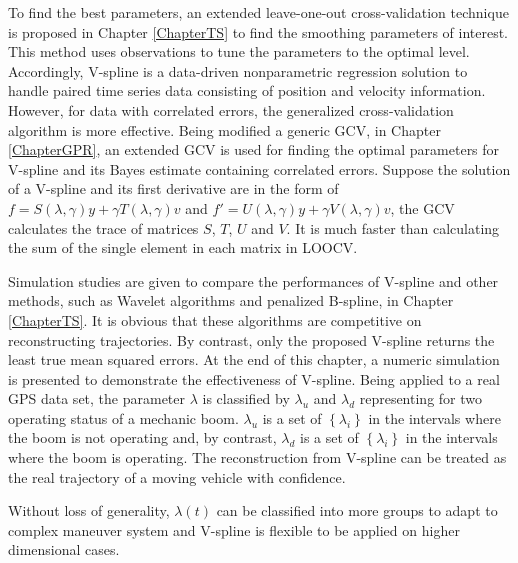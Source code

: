 
To find the best parameters, an extended leave-one-out cross-validation technique is proposed in Chapter \ref{ChapterTS} to find the smoothing parameters of interest. This method uses observations to tune the parameters to the optimal level. Accordingly, V-spline is a data-driven nonparametric regression solution to handle paired time series data consisting of position and velocity information. However, for data with correlated errors, the generalized cross-validation algorithm is more effective. Being modified a generic GCV, in Chapter \ref{ChapterGPR}, an extended GCV is used for finding the optimal parameters for V-spline and its Bayes estimate containing correlated errors. Suppose the solution of a V-spline and its first derivative are in the form of $f=S(\lambda,\gamma)y+\gamma T(\lambda,\gamma)v$ and $f'=U(\lambda,\gamma)y+\gamma V(\lambda,\gamma)v$, the GCV calculates the trace of matrices $S$, $T$, $U$ and $V$. It is much faster than calculating the sum of the single element in each matrix in LOOCV. 

Simulation studies are given to compare the performances of V-spline and other methods, such as Wavelet algorithms and penalized B-spline, in Chapter \ref{ChapterTS}. It is obvious that these algorithms are competitive on reconstructing trajectories. By contrast, only the proposed V-spline returns the least true mean squared errors. At the end of this chapter, a numeric simulation is presented to demonstrate the effectiveness of V-spline. Being applied to a real GPS data set, the parameter $\lambda$ is classified by $\lambda_u$ and $\lambda_d$ representing for two operating status of a mechanic boom. $\lambda_u$ is a set of $\left\lbrace\lambda_i\right\rbrace$ in the intervals where the boom is not operating and, by contrast, $\lambda_d$ is a set of $\left\lbrace\lambda_i\right\rbrace$ in the intervals where the boom is operating. The reconstruction from V-spline can be treated as the real trajectory of a moving vehicle with confidence. 

Without loss of generality, $\lambda(t)$ can be classified into more groups to adapt to complex maneuver system and V-spline is flexible to be applied on higher dimensional cases. 

